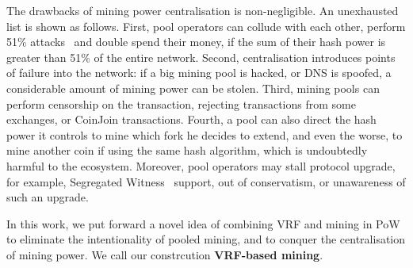 The drawbacks of mining power centralisation is non-negligible.
An unexhausted list is shown as follows.
First, pool operators can collude with each other, perform 51\% attacks~\cite{} and double spend their money, if the sum of their hash power is greater than 51\% of the entire network.
Second, centralisation introduces points of failure into the network: if a big mining pool is hacked, or DNS is spoofed, a considerable amount of mining power can be stolen.
Third, mining pools can perform censorship on the transaction, rejecting transactions from some exchanges, or CoinJoin transactions.
Fourth, a pool can also direct the hash power it controls to mine which fork he decides to extend, and even the worse, to mine another coin if using the same hash algorithm, which is undoubtedly harmful to the ecosystem.
Moreover, pool operators may stall protocol upgrade, for example, Segregated Witness~\cite{segwit} support, out of conservatism, or unawareness of such an upgrade.

In this work, we put forward a novel idea of combining VRF and mining in PoW to eliminate the intentionality of pooled mining, and to conquer the centralisation of mining power. We call our constrcution \textbf{VRF-based mining}.

